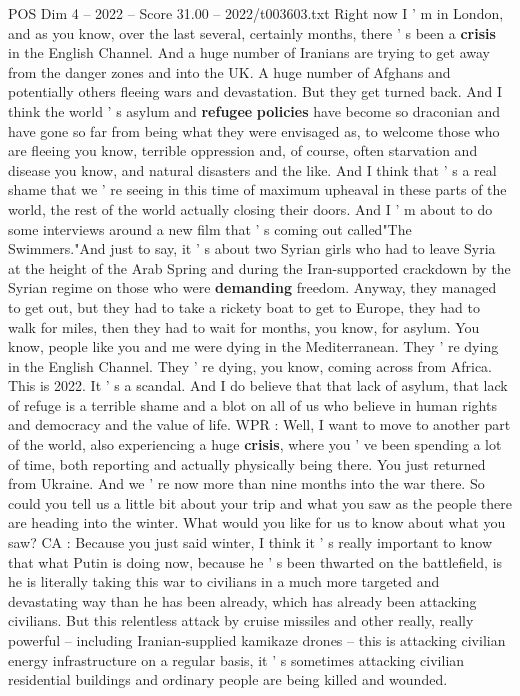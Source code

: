 \begin{textsample}{POS Dim 4 – 2022 – Score 31.00 – 2022/t003603.txt}
Right now I ' m in London, and as you know, over the last several, certainly months, there ' s been a \textbf{crisis} in the English Channel.
And a huge number of Iranians are trying to get away from the danger zones and into the UK.
A huge number of Afghans and potentially others fleeing wars and devastation.
But they get turned back.
And I think the world ' s asylum and \textbf{refugee} \textbf{policies} have become so draconian and have gone so far from being what they were envisaged as, to welcome those who are fleeing you know, terrible oppression and, of course, often starvation and disease you know, and natural disasters and the like.
And I think that ' s a real shame that we ' re seeing in this time of maximum upheaval in these parts of the world, the rest of the world actually closing their doors.
And I ' m about to do some interviews around a new film that ' s coming out called"The Swimmers."And just to say, it ' s about two Syrian girls who had to leave Syria at the height of the Arab Spring and during the Iran-supported crackdown by the Syrian regime on those who were \textbf{demanding} freedom.
Anyway, they managed to get out, but they had to take a rickety boat to get to Europe, they had to walk for miles, then they had to wait for months, you know, for asylum.
You know, people like you and me were dying in the Mediterranean.
They ' re dying in the English Channel.
They ' re dying, you know, coming across from Africa.
This is 2022.
It ' s a scandal.
And I do believe that that lack of asylum, that lack of refuge is a terrible shame and a blot on all of us who believe in human rights and democracy and the value of life.
WPR : Well, I want to move to another part of the world, also experiencing a huge \textbf{crisis}, where you ' ve been spending a lot of time, both reporting and actually physically being there.
You just returned from Ukraine.
And we ' re now more than nine months into the war there.
So could you tell us a little bit about your trip and what you saw as the people there are heading into the winter.
What would you like for us to know about what you saw?
CA : Because you just said winter, I think it ' s really important to know that what Putin is doing now, because he ' s been thwarted on the battlefield, is he is literally taking this war to civilians in a much more targeted and devastating way than he has been already, which has already been attacking civilians.
But this relentless attack by cruise missiles and other really, really powerful -- including Iranian-supplied kamikaze drones -- this is attacking civilian energy infrastructure on a regular basis, it ' s sometimes attacking civilian residential buildings and ordinary people are being killed and wounded.

\end{textsample}
